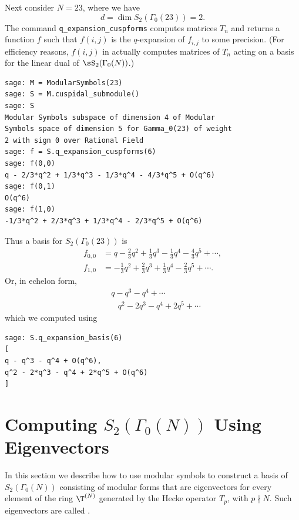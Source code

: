 \begin{example}
Next consider $N=23$, where we have 
$$d = \dim S_2(\Gamma_0(23)) = 2.$$
The command {\tt q\_expansion\_cuspforms} computes 
matrices $T_n$ and returns a function
$f$ such that $f(i,j)$ is the $q$-expansion of 
$f_{i,j}$ to some precision. 
(For efficiency reasons, $f(i,j)$ in \sage{} actually
computes matrices of $T_n$ acting
on a basis for the linear dual of $\sS_2(\Gamma_0(N))$.)
\begin{verbatim}
sage: M = ModularSymbols(23)
sage: S = M.cuspidal_submodule()
sage: S
Modular Symbols subspace of dimension 4 of Modular 
Symbols space of dimension 5 for Gamma_0(23) of weight 
2 with sign 0 over Rational Field
sage: f = S.q_expansion_cuspforms(6)
sage: f(0,0)
q - 2/3*q^2 + 1/3*q^3 - 1/3*q^4 - 4/3*q^5 + O(q^6)
sage: f(0,1)
O(q^6)
sage: f(1,0)
-1/3*q^2 + 2/3*q^3 + 1/3*q^4 - 2/3*q^5 + O(q^6)
\end{verbatim}%

Thus a basis for $S_2(\Gamma_0(23))$ is
\begin{align*}
f_{0,0} &= q - \frac{2}{3}q^{2} + \frac{1}{3}q^{3} - \frac{1}{3}q^{4} - \frac{4}{3}q^{5} + \cdots, \\
f_{1,0} &= -\frac{1}{3}q^{2} + \frac{2}{3}q^{3} + \frac{1}{3}q^{4} - \frac{2}{3}q^{5} + \cdots.
\end{align*}
Or, in echelon form, 
\begin{align*}
 & q - q^{3} - q^{4} + \cdots\\
 & \,\,\,\,\,q^{2} - 2q^{3} - q^{4} + 2q^{5} + \cdots
\end{align*}
which we computed using
\begin{verbatim}
sage: S.q_expansion_basis(6)
[
q - q^3 - q^4 + O(q^6),
q^2 - 2*q^3 - q^4 + 2*q^5 + O(q^6)
]
\end{verbatim}

\end{example}



\section{Computing $S_2(\Gamma_0(N))$ Using Eigenvectors}
\label{sec:computingmodform}
In this section we describe how to use modular symbols to construct a
basis of $S_2(\Gamma_0(N))$ consisting of modular forms that are
eigenvectors for every element of the ring $\T^{(N)}$ generated by the
Hecke operator $T_p$, with $p\nmid N$.  Such eigenvectors are called
.

